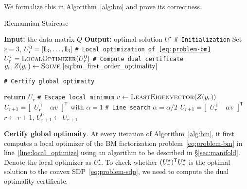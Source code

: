We formalize this in Algorithm~\ref{alg:bm} and prove its correctness.

\setlength{\intextsep}{0pt}  %
\begin{algorithm}[ht]
    \caption{Riemannian Staircase}
    \label{alg:bm}
    \begin{algorithmic}[1]
        \STATE \textbf{Input:} the data matrix $Q$
        \STATE \textbf{Output:} optimal solution $U^\star$
        \STATE \texttt{\# Initialization}
        \STATE Set $r = 3$, $U_r^0 = [\eye_3, \dots, \eye_3]$ 
        \STATE \texttt{\# Local optimization of~\eqref{eq:problem-bm}}
        \STATE $U_r^\star= \textsc{LocalOptimizer}(U_r^0)$ \label{line:local_optimize}
        \STATE \texttt{\# Compute dual certificate}
        \STATE $y_r, Z(y_r) \leftarrow \textsc{Solve}~\eqref{eq:bm_first_order_optimality}$ \label{line:bm_first_order}

        \STATE \texttt{\# Certify global optimaity}

        \STATE \textbf{return} $U_r$ \label{line:bm_return}
        \ENDIF
        \STATE \texttt{\# Escape local minimum}
        \STATE $v \leftarrow \textsc{LeastEigenvector}(Z(y_r))$ \label{line:bm_eigen_vector}
        \STATE $U_{r+1} = \bmat{cc} U_r\tran & \alpha v \emat \tran$ with $\alpha=1$
        \STATE \texttt{\# Line search}
        \STATE $\alpha = \alpha/2$ \label{line:linesearch-1}
        \STATE $U_{r+1} = \bmat{cc} U_r\tran & \alpha v \emat \tran$ \label{line:linesearch-2}
        \ENDWHILE
        \STATE $r \leftarrow r+1$, $U_{r+1}^0 \leftarrow U_{r+1}$ \label{line:bm_increase_rank}
        \ENDWHILE
    \end{algorithmic}
\end{algorithm}

\textbf{Certify global optimaity}. At every iteration of Algorithm~\ref{alg:bm}, it first computes a local optimizer of the BM factorization problem~\eqref{eq:problem-bm} in line~\ref{line:local_optimize} using an algorithm to be described in \S\ref{sec:manifold}. Denote the local optimizer as $U^\star_r$. To check whether $(U^\star_r)\tran U^\star_r$ is the optimal solution to the convex SDP~\eqref{eq:problem-sdp}, we need to compute the dual optimality certificate.

